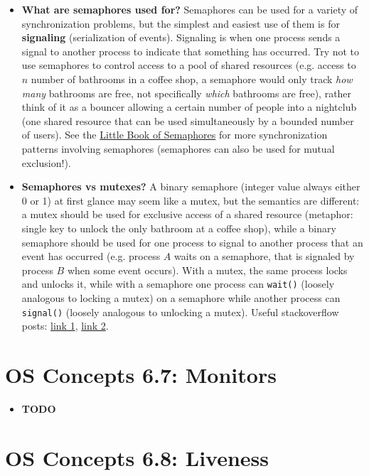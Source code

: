 \documentclass[12pt]{article}
\begin{document}
\begin{itemize}
    \item \textbf{What are semaphores used for?} Semaphores can be used for a variety of synchronization problems, but the simplest and easiest use of them is for \textbf{signaling} (serialization of events). Signaling is when one process sends a signal to another process to indicate that something has occurred. Try not to use semaphores to control access to a pool of shared resources (e.g. access to \(n\) number of bathrooms in a coffee shop, a semaphore would only track \textit{how many} bathrooms are free, not specifically \textit{which} bathrooms are free), rather think of it as a bouncer allowing a certain number of people into a nightclub (one shared resource that can be used simultaneously by a bounded number of users). See the \href{https://greenteapress.com/semaphores/LittleBookOfSemaphores.pdf}{Little Book of Semaphores} for more synchronization patterns involving semaphores (semaphores can also be used for mutual exclusion!).
    \item \textbf{Semaphores vs mutexes?} A binary semaphore (integer value always either 0 or 1) at first glance may seem like a mutex, but the semantics are different: a mutex should be used for exclusive access of a shared resource (metaphor: single key to unlock the only bathroom at a coffee shop), while a binary semaphore should be used for one process to signal to another process that an event has occurred (e.g. process \(A\) waits on a semaphore, that is signaled by process \(B\) when some event occurs). With a mutex, the same process locks and unlocks it, while with a semaphore one process can \texttt{wait()} (loosely analogous to locking a mutex) on a semaphore while another process can \texttt{signal()} (loosely analogous to unlocking a mutex). Useful stackoverflow posts: \href{https://stackoverflow.com/a/86021/7162381}{link 1}, \href{https://stackoverflow.com/a/40238/7162381}{link 2}.
\end{itemize}

\section*{OS Concepts 6.7: Monitors}

\begin{itemize}
    \item \textbf{TODO}
\end{itemize}

\section*{OS Concepts 6.8: Liveness}
\end{document}
